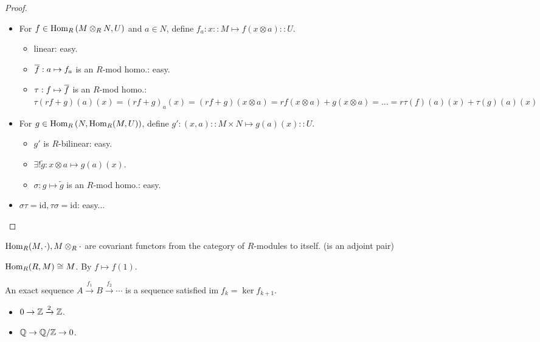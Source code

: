 \begin{proof} \mbox{}
  \begin{itemize}
    \item For $f \in \operatorname{Hom}_R\left(M \otimes_R N, U\right)$ and $a \in N$,
      define $f_a: x :: M \mapsto f(x \otimes a) :: U$.
      \begin{itemize}
        \item linear: easy.
        \item $\overline{f}: a \mapsto f_a$ is an $R$-mod homo.: easy.
        \item $\tau: f \mapsto \overline{f}$ is an $R$-mod homo.:
          $\tau(rf+g)(a)(x) = (rf+g)_a(x) = (rf+g)(x\otimes a)
          = rf(x\otimes a) + g(x\otimes a) = \dots
          = r\tau(f)(a)(x) + \tau(g)(a)(x)$
      \end{itemize}
    \item For $g \in \operatorname{Hom}_R\left(N, \operatorname{Hom}_R(M, U)\right)$,
      define $g': (x, a) :: M \times N \mapsto g(a)(x) :: U$.
      \begin{itemize}
        \item $g'$ is $R$-bilinear: easy.
        \item $\exists! \tilde{g}: x\otimes a \mapsto g(a)(x)$.
        \item $\sigma: g\mapsto \tilde{g}$ is an $R$-mod homo.: easy.
      \end{itemize}
    \item $\sigma \tau = \text{id}, \tau \sigma = \text{id}$: easy...
      \qedhere
  \end{itemize}
\end{proof}

\begin{exercise}
  $\operatorname{Hom}_R(M, \cdot), M \otimes_R \cdot$ are covariant functors from the
  category of $R$-modules to itself.
  (is an adjoint pair)
\end{exercise}

\begin{fact}
  $\operatorname{Hom}_R(R, M) \cong M$. By $f \mapsto f(1)$.
\end{fact}

\begin{definition}
  An exact sequence $A \xrightarrow{f_1} B \xrightarrow{f_2} \cdots$ is
  a sequence satisfied $\text{im}\; f_k = \ker f_{k+1}$.
\end{definition}

\begin{itemize}
  \item $0 \to \mathbb{Z} \xrightarrow{2} \mathbb{Z}$.
  \item $\mathbb{Q} \to {\mathbb{Q}}/{\mathbb{Z}} \to 0$.
\end{itemize}

